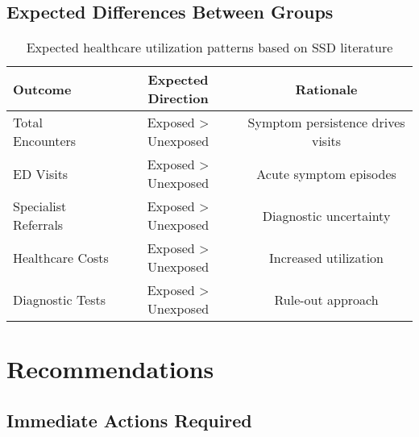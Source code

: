 \documentclass[11pt]{article}
\begin{document}
\subsection{Expected Differences Between Groups}

\begin{table}[H]
\centering
\begin{tabular}{lcc}
\toprule
\textbf{Outcome} & \textbf{Expected Direction} & \textbf{Rationale} \\
\midrule
Total Encounters & Exposed > Unexposed & Symptom persistence drives visits \\
ED Visits & Exposed > Unexposed & Acute symptom episodes \\
Specialist Referrals & Exposed > Unexposed & Diagnostic uncertainty \\
Healthcare Costs & Exposed > Unexposed & Increased utilization \\
Diagnostic Tests & Exposed > Unexposed & Rule-out approach \\
\bottomrule
\end{tabular}
\caption{Expected healthcare utilization patterns based on SSD literature}
\label{tab:expected}
\end{table}

\section{Recommendations}

\subsection{Immediate Actions Required}
\end{document}
